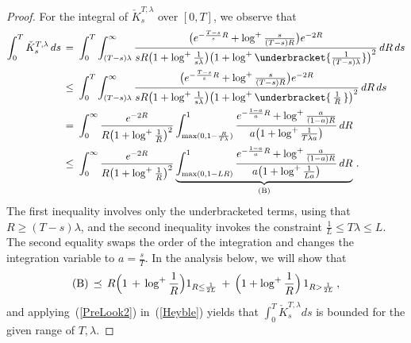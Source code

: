 \documentclass[10pt]{article}
\numberwithin{equation}{section}
\theoremstyle{definition}
\begin{document}
\begin{proof}
For the integral of  $\check{K}_s^{T,\lambda}$ over $[0,T]$, we observe that
\begin{align}\label{Heyble}  
\int_0^T \check{K}_s^{T,\lambda}\,ds\, =\,& \, \int_0^T\int^{\infty  }_{(T-s)\lambda}   \frac{\big( e^{-\frac{T-s}{s}R}+\log^{+}\frac{s}{(T-s)R}  \big)e^{-2R }    }{s R\big( 1+ \log^+ \frac{1}{s\lambda } \big)\big(1+\log^+\underbracket{\frac{1}{(T-s)\lambda}}\big)^2    }\,dR\,  ds \nonumber  \\
\, \leq \,& \, \int_0^T\int^{\infty  }_{(T-s)\lambda}   \frac{\big( e^{-\frac{T-s}{s}R}+\log^{+}\frac{s}{(T-s)R}  \big)e^{-2R }    }{s R\big( 1+ \log^+ \frac{1}{s\lambda } \big)\big(1+\log^+\underbracket{\,\frac{1}{R}\,}\big)^2    }\,dR\,  ds \nonumber   \\
 \, =\,& \, \int_0^{\infty}  \frac{  e^{- 2R     }   }{R\big(1+\log^+ \frac{1}{R}  \big)^2 }   \int^{1  }_{\textup{max}(0,1-\frac{ R }{ T\lambda  }) }\frac{ e^{-\frac{1-a}{a}R}+\log^{+}\frac{a}{(1-a)R}  }{a\big( 1+ \log^+ \frac{1}{T\lambda a} \big)} \,dR  \nonumber   \\
 \, \leq \,& \, \int_0^{\infty}  \frac{  e^{- 2R     }   }{R\big(1+\log^+ \frac{1}{R}  \big)^2 }   \underbrace{\int^{1  }_{\textup{max}(0,1-LR ) }\frac{ e^{-\frac{1-a}{a}R}+\log^{+}\frac{a}{(1-a)R}  }{a\big( 1+ \log^+ \frac{1}{L a} \big)} \,dR}_{ \textup{(B)} } 
 \,.
\end{align}
The first inequality  involves only the underbracketed terms, using that $R\geq (T-s)\lambda$, and  the second inequality invokes  the constraint $\frac{1}{L}\leq T\lambda \leq L $.   The second equality swaps the order of the integration and changes the integration variable to $a=\frac{s}{T}$.  In the analysis below,  we will show that 
\begin{align}\label{PreLook2}
\textup{(B)}\,\preceq \, R \Big(1\,+\,\log^{+}\frac{1}{R} \Big) 1_{R\leq  \frac{1}{2L} }  \,+\,\Big(1+\log^+\frac{1}{R}\Big)\,1_{R >  \frac{1}{2L} }    \,,
\end{align}
and applying~(\ref{PreLook2}) in~(\ref{Heyble}) yields that $\int_0^T \check{K}_s^{T,\lambda}ds$ is bounded for the given range of $T,\lambda$.



\end{proof}
\end{document}

